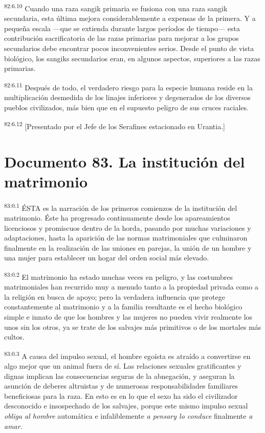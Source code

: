 \documentclass[twoside, 11pt]{book}
\begin{document}
\par
\textsuperscript{82:6.10} Cuando una raza sangik primaria se fusiona con una raza sangik secundaria, esta última mejora considerablemente a expensas de la primera. Y a pequeña escala ---que se extienda durante largos períodos de tiempo--- esta contribución sacrificatoria de las razas primarias para mejorar a los grupos secundarios debe encontrar pocos inconvenientes serios. Desde el punto de vista biológico, los sangiks secundarios eran, en algunos aspectos, superiores a las razas primarias.

\par
\textsuperscript{82:6.11} Después de todo, el verdadero riesgo para la especie humana reside en la multiplicación desmedida de los linajes inferiores y degenerados de los diversos pueblos civilizados, más bien que en el supuesto peligro de sus cruces raciales.

\par
\textsuperscript{82:6.12} [Presentado por el Jefe de los Serafines estacionado en Urantia.]


\chapter{Documento 83. La institución del matrimonio}
\par
\textsuperscript{83:0.1} ÉSTA es la narración de los primeros comienzos de la institución del matrimonio. Éste ha progresado continuamente desde los apareamientos licenciosos y promiscuos dentro de la horda, pasando por muchas variaciones y adaptaciones, hasta la aparición de las normas matrimoniales que culminaron finalmente en la realización de las uniones en parejas, la unión de un hombre y una mujer para establecer un hogar del orden social más elevado.

\par
\textsuperscript{83:0.2} El matrimonio ha estado muchas veces en peligro, y las costumbres matrimoniales han recurrido muy a menudo tanto a la propiedad privada como a la religión en busca de apoyo; pero la verdadera influencia que protege constantemente al matrimonio y a la familia resultante es el hecho biológico simple e innato de que los hombres y las mujeres no pueden vivir realmente los unos sin los otros, ya se trate de los salvajes más primitivos o de los mortales más cultos.

\par
\textsuperscript{83:0.3} A causa del impulso sexual, el hombre egoísta es atraído a convertirse en algo mejor que un animal fuera de sí. Las relaciones sexuales gratificantes y dignas implican las consecuencias seguras de la abnegación, y aseguran la asunción de deberes altruistas y de numerosas responsabilidades familiares beneficiosas para la raza. En esto es en lo que el sexo ha sido el civilizador desconocido e insospechado de los salvajes, porque este mismo impulso sexual \textit{obliga al hombre} automática e infaliblemente \textit{a pensary lo conduce} finalmente \textit{a amar}.
\end{document}
